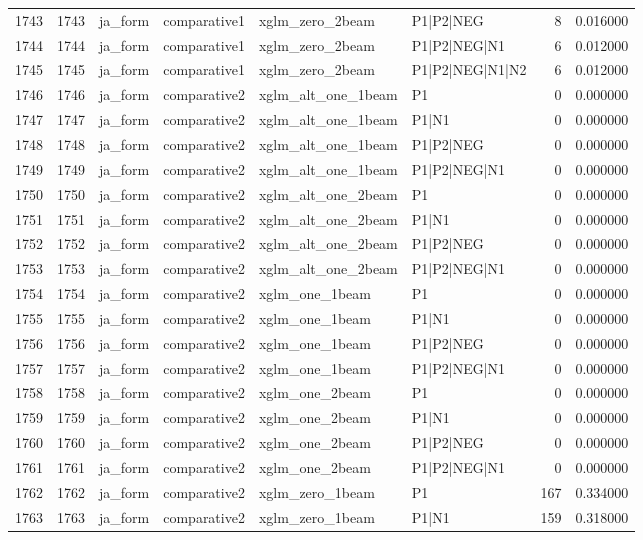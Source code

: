 \begin{tabular}{lrllllrr}
1743 & 1743 & ja_form & comparative1 & xglm_zero_2beam & P1|P2|NEG & 8 & 0.016000 \\
1744 & 1744 & ja_form & comparative1 & xglm_zero_2beam & P1|P2|NEG|N1 & 6 & 0.012000 \\
1745 & 1745 & ja_form & comparative1 & xglm_zero_2beam & P1|P2|NEG|N1|N2 & 6 & 0.012000 \\
1746 & 1746 & ja_form & comparative2 & xglm_alt_one_1beam & P1 & 0 & 0.000000 \\
1747 & 1747 & ja_form & comparative2 & xglm_alt_one_1beam & P1|N1 & 0 & 0.000000 \\
1748 & 1748 & ja_form & comparative2 & xglm_alt_one_1beam & P1|P2|NEG & 0 & 0.000000 \\
1749 & 1749 & ja_form & comparative2 & xglm_alt_one_1beam & P1|P2|NEG|N1 & 0 & 0.000000 \\
1750 & 1750 & ja_form & comparative2 & xglm_alt_one_2beam & P1 & 0 & 0.000000 \\
1751 & 1751 & ja_form & comparative2 & xglm_alt_one_2beam & P1|N1 & 0 & 0.000000 \\
1752 & 1752 & ja_form & comparative2 & xglm_alt_one_2beam & P1|P2|NEG & 0 & 0.000000 \\
1753 & 1753 & ja_form & comparative2 & xglm_alt_one_2beam & P1|P2|NEG|N1 & 0 & 0.000000 \\
1754 & 1754 & ja_form & comparative2 & xglm_one_1beam & P1 & 0 & 0.000000 \\
1755 & 1755 & ja_form & comparative2 & xglm_one_1beam & P1|N1 & 0 & 0.000000 \\
1756 & 1756 & ja_form & comparative2 & xglm_one_1beam & P1|P2|NEG & 0 & 0.000000 \\
1757 & 1757 & ja_form & comparative2 & xglm_one_1beam & P1|P2|NEG|N1 & 0 & 0.000000 \\
1758 & 1758 & ja_form & comparative2 & xglm_one_2beam & P1 & 0 & 0.000000 \\
1759 & 1759 & ja_form & comparative2 & xglm_one_2beam & P1|N1 & 0 & 0.000000 \\
1760 & 1760 & ja_form & comparative2 & xglm_one_2beam & P1|P2|NEG & 0 & 0.000000 \\
1761 & 1761 & ja_form & comparative2 & xglm_one_2beam & P1|P2|NEG|N1 & 0 & 0.000000 \\
1762 & 1762 & ja_form & comparative2 & xglm_zero_1beam & P1 & 167 & 0.334000 \\
1763 & 1763 & ja_form & comparative2 & xglm_zero_1beam & P1|N1 & 159 & 0.318000 \\

\end{tabular}
